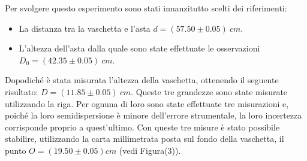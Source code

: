 Per svolgere questo esperimento sono stati innanzitutto scelti dei riferimenti:
\begin{itemize}
	\item La distanza tra la vaschetta e l'asta $d=(57.50\pm0.05)\ cm$.
	\item L'altezza dell'asta dalla quale sono state effettuate le osservazioni $D_0=(42.35\pm0.05)\ cm$.
\end{itemize}
Dopodiché è stata misurata l'altezza della vaschetta, ottenendo il seguente risultato: $D=(11.85\pm0.05)\ cm$. Queste tre grandezze sono state misurate utilizzando la riga. Per ognuna di loro sono state effettuate tre misurazioni e, poiché la loro semidispersione è minore dell'errore strumentale, la loro incertezza corrisponde proprio a quest'ultimo. Con queste tre misure è stato possibile stabilire, utilizzando la carta millimetrata posta sul fondo della vaschetta, il punto $O=(19.50\pm0.05) cm$ (vedi Figura(3)).